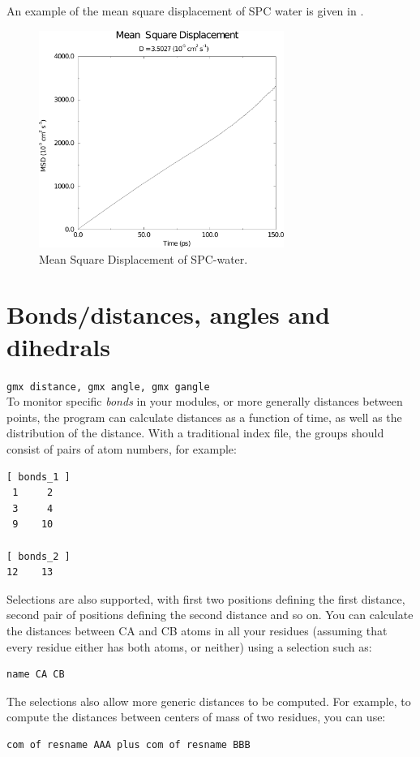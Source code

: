 An example of the mean square displacement of SPC water is given in
.

\begin{figure}
\centerline{
{\includegraphics[width=8cm]{plots/msdwater}}}
\caption{Mean Square Displacement of SPC-water.}
\label{fig:msdwater}
\end{figure}


% 
% 
\section{Bonds/distances, angles and dihedrals}
\label{sec:bad}
{\tt gmx distance, gmx angle, gmx gangle}\\
To monitor specific {\em bonds} in your modules, or more generally
distances between points, the program
{\tt {}} can calculate distances as a function of
time, as well as the distribution of the distance.
With a traditional index file, the groups should consist of pairs of
atom numbers, for example:
\begin{verbatim}
[ bonds_1 ]
 1     2
 3     4
 9    10

[ bonds_2 ]
12    13
\end{verbatim}
Selections are also supported, with first two positions defining the
first distance, second pair of positions defining the second distance
and so on.  You can calculate the distances between CA and CB atoms in
all your residues (assuming that every residue either has both atoms, or
neither) using a selection such as:
\begin{verbatim}
name CA CB
\end{verbatim}
The selections also allow more generic distances to be computed.
For example, to compute the distances between centers of mass of two
residues, you can use:
\begin{verbatim}
com of resname AAA plus com of resname BBB
\end{verbatim}

